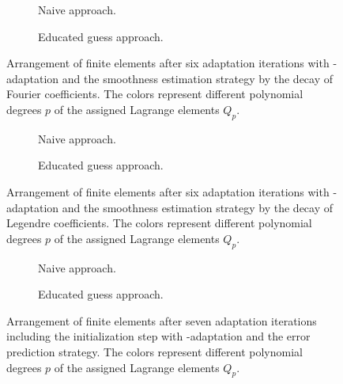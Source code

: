 \begin{figure}
\begin{subfigure}{1\textwidth}
  \centering
  
  \caption{Naive approach.}
\end{subfigure}
\begin{subfigure}{1\textwidth}
  \centering
  
  \caption{Educated guess approach.}
\end{subfigure}
\caption[Arrangement of finite elements with \hp-adaptation and the Fourier coefficient decay strategy.]{Arrangement of finite elements after six adaptation iterations with \hp-adaptation and the smoothness estimation strategy by the decay of Fourier coefficients. The colors represent different polynomial degrees $p$ of the assigned Lagrange elements $Q_p$.}
\label{fig:meshfourier}
\end{figure}

\begin{figure}
\begin{subfigure}{1\textwidth}
  \centering
  
  \caption{Naive approach.}
\end{subfigure}
\begin{subfigure}{1\textwidth}
  \centering
  
  \caption{Educated guess approach.}
\end{subfigure}
\caption[Arrangement of finite elements with \hp-adaptation and the Legendre coefficient decay strategy.]{Arrangement of finite elements after six adaptation iterations with \hp-adaptation and the smoothness estimation strategy by the decay of Legendre coefficients. The colors represent different polynomial degrees $p$ of the assigned Lagrange elements $Q_p$.}
\label{fig:meshlegendre}
\end{figure}

\begin{figure}
\begin{subfigure}{1\textwidth}
  \centering
  
  \caption{Naive approach.}
\end{subfigure}
\begin{subfigure}{1\textwidth}
  \centering
  
  \caption{Educated guess approach.}
\end{subfigure}
\caption[Arrangement of finite elements with \hp-adaptation and the error prediction strategy.]{Arrangement of finite elements after seven adaptation iterations including the initialization step with \hp-adaptation and the error prediction strategy. The colors represent different polynomial degrees $p$ of the assigned Lagrange elements $Q_p$.}
\label{fig:meshprediction}
\end{figure}